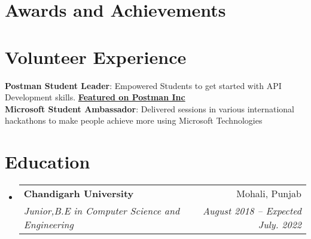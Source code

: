 \documentclass[letterpaper,11pt]{article}
\makeatletter
\newcommand{\resumeSubheading}[4]{
  \vspace{-2pt}\item
    \begin{tabular*}{0.97\textwidth}[t]{l@{\extracolsep{\fill}}r}
      \textbf{#1} & #2 \\
      \textit{\small#3} & \textit{\small #4} \\
    \end{tabular*}\vspace{-7pt}
}
\newcommand{\resumeSubHeadingListStart}{\begin{itemize}[leftmargin=0.15in, label={}]}
\newcommand{\resumeSubHeadingListEnd}{\end{itemize}}
\makeatother
\begin{document}
\section{Awards and Achievements}
 \begin{itemize}[leftmargin=0.15in, label={}]
    \small{\item{
    }}
 \end{itemize}
 \section{Volunteer Experience}
 \begin{itemize}[leftmargin=0.15in, label={}]
    \small{\item{
     \textbf{Postman Student Leader}{: Empowered Students to get started with API Development skills. \textbf{\href{https://blog.postman.com/announcing-the-postman-student-leader-program/}{Featured on Postman Inc}} } \\
     \textbf{Microsoft Student Ambassador}{: Delivered sessions in various international hackathons to make people achieve more using Microsoft Technologies }
    }}
 \end{itemize}
\section{Education}
  \resumeSubHeadingListStart
    \resumeSubheading
      {Chandigarh University}{Mohali, Punjab}
      {Junior,B.E in Computer Science and Engineering}{August 2018 -- Expected July. 2022}
  \resumeSubHeadingListEnd
\end{document}

